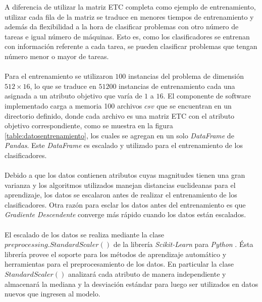 A diferencia de utilizar la matriz ETC completa como ejemplo de entrenamiento, utilizar cada fila de la matriz se traduce en menores tiempos de entrenamiento y además da flexibilidad a la hora de clasificar problemas con otro número de tareas e igual número de máquinas. Esto es, como los clasificadores se entrenan con información referente a cada tarea, se pueden clasificar problemas que tengan número menor o mayor de tareas. 

\paragraph{} Para el entrenamiento se utilizaron $100$ instancias del problema de dimensión $512 \times 16$, lo que se traduce en $51200$ instancias de entrenamiento cada una asignada a un atributo objetivo que varía de $1$ a $16$. El componente de software implementado carga a memoria 100 archivos $csv$ que se encuentran en un directorio definido, donde cada archivo es una matriz ETC con el atributo objetivo correspondiente, como se muestra en la figura \ref{table:datosentrenamiento}, los cuales se agregan en un solo \textit{DataFrame}\cite{DataFrame-pandas} de \textit{Pandas}. Este \textit{DataFrame} es escalado y utilizado para el entrenamiento de los clasificadores.

\paragraph{} Debido a que los datos contienen atributos cuyas magnitudes tienen una gran varianza y los algoritmos utilizados manejan distancias euclideanas para el aprendizaje, los datos se escalaron antes de realizar el entrenamiento de los clasificadores. Otra razón para esclar los datos antes del entrenamiento es que \textit{Gradiente Descendente} converge más rápido cuando los datos están escalados\cite{gradiente-descendente-escalado}.

\paragraph{} El escalado de los datos se realiza mediante la clase $preprocessing.StandardScaler()$ de la librería \textit{Scikit-Learn} para \textit{Python} \cite{scikit-learn}. Ésta librería provee el soporte para los métodos de aprendizaje automático y herramientas para el preprocesamiento de los datos. En particular la clase $StandardScaler()$ analizará cada atributo de manera independiente y almacenará la mediana y la desviación estándar para luego ser utilizados en datos nuevos que ingresen al modelo.\cite{StandardScaler-scikit-learn}  

